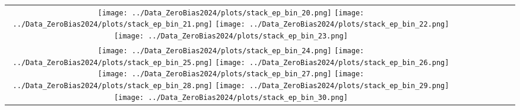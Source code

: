 \documentclass[a4paper,10pt]{article}
\begin{document}
\begin{center}
\begin{tabular}{cccccccc}
    \texttt{[image: ../Data\_ZeroBias2024/plots/stack\_ep\_bin\_20.png]} %
    \texttt{[image: ../Data\_ZeroBias2024/plots/stack\_ep\_bin\_21.png]} %
    \texttt{[image: ../Data\_ZeroBias2024/plots/stack\_ep\_bin\_22.png]} %
    \texttt{[image: ../Data\_ZeroBias2024/plots/stack\_ep\_bin\_23.png]} \\
    \texttt{[image: ../Data\_ZeroBias2024/plots/stack\_ep\_bin\_24.png]} %
    \texttt{[image: ../Data\_ZeroBias2024/plots/stack\_ep\_bin\_25.png]} %
    \texttt{[image: ../Data\_ZeroBias2024/plots/stack\_ep\_bin\_26.png]} %
    \texttt{[image: ../Data\_ZeroBias2024/plots/stack\_ep\_bin\_27.png]} %
    \texttt{[image: ../Data\_ZeroBias2024/plots/stack\_ep\_bin\_28.png]} %
    \texttt{[image: ../Data\_ZeroBias2024/plots/stack\_ep\_bin\_29.png]} %
    \texttt{[image: ../Data\_ZeroBias2024/plots/stack\_ep\_bin\_30.png]} %
\end{tabular}
\end{center}
\newpage
\end{document}
